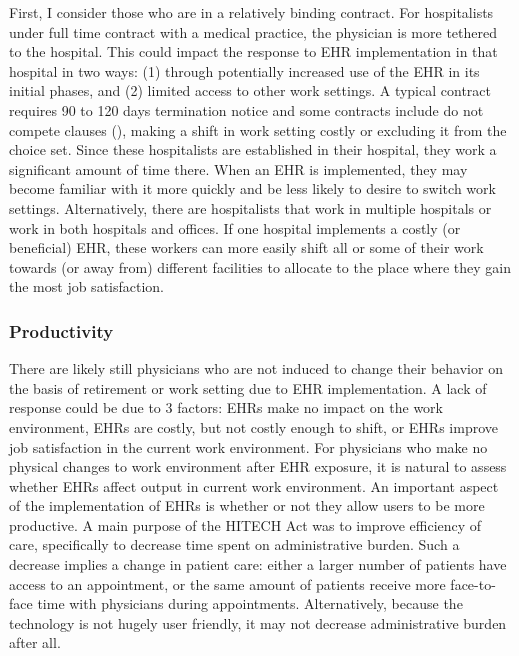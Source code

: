 \documentclass[12pt]{article}
\begin{document}
First, I consider those who are in a relatively binding contract. For hospitalists under full time contract with a medical practice, the physician is more tethered to the hospital. This could impact the response to EHR implementation in that hospital in two ways: (1) through potentially increased use of the EHR in its initial phases, and (2) limited access to other work settings. A typical contract requires 90 to 120 days termination notice and some contracts include do not compete clauses (\cite{yasgur_by_-_yasgur_2016}), making a shift in work setting costly or excluding it from the choice set. Since these hospitalists are established in their hospital, they work a significant amount of time there. When an EHR is implemented, they may become familiar with it more quickly and be less likely to desire to switch work settings. Alternatively, there are hospitalists that work in multiple hospitals or work in both hospitals and offices. If one hospital implements a costly (or beneficial) EHR, these workers can more easily shift all or some of their work towards (or away from) different facilities to allocate to the place where they gain the most job satisfaction.  


\subsubsection{Productivity}

There are likely still physicians who are not induced to change their behavior on the basis of retirement or work setting due to EHR implementation. A lack of response could be due to 3 factors: EHRs make no impact on the work environment, EHRs are costly, but not costly enough to shift, or EHRs improve job satisfaction in the current work environment. For physicians who make no physical changes to work environment after EHR exposure, it is natural to assess whether EHRs affect output in current work environment. An important aspect of the implementation of EHRs is whether or not they allow users to be more productive. A main purpose of the HITECH Act was to improve efficiency of care, specifically to decrease time spent on administrative burden. Such a decrease implies a change in patient care: either a larger number of patients have access to an appointment, or the same amount of patients receive more face-to-face time with physicians during appointments. Alternatively, because the technology is not hugely user friendly, it may not decrease administrative burden after all.
\end{document}
